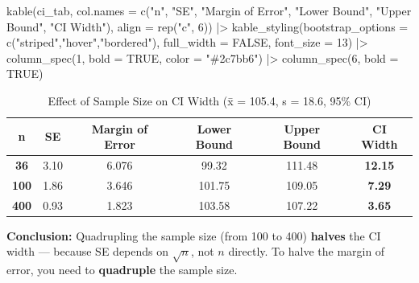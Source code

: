 \documentclass[
  12pt,
  letterpaper,
]{book}
\newenvironment{Shaded}{\begin{snugshade}}{\end{snugshade}}
\newcommand{\AttributeTok}[1]{\textcolor[rgb]{0.40,0.45,0.13}{#1}}
\newcommand{\ConstantTok}[1]{\textcolor[rgb]{0.56,0.35,0.01}{#1}}
\newcommand{\DecValTok}[1]{\textcolor[rgb]{0.68,0.00,0.00}{#1}}
\newcommand{\FunctionTok}[1]{\textcolor[rgb]{0.28,0.35,0.67}{#1}}
\newcommand{\NormalTok}[1]{\textcolor[rgb]{0.00,0.23,0.31}{#1}}
\newcommand{\SpecialCharTok}[1]{\textcolor[rgb]{0.37,0.37,0.37}{#1}}
\newcommand{\StringTok}[1]{\textcolor[rgb]{0.13,0.47,0.30}{#1}}
\begin{document}
\begin{tcolorbox}
\begin{Shaded}
\begin{Highlighting}[]
\FunctionTok{kable}\NormalTok{(ci\_tab,}
      \AttributeTok{col.names =} \FunctionTok{c}\NormalTok{(}\StringTok{"n"}\NormalTok{, }\StringTok{"SE"}\NormalTok{, }\StringTok{"Margin of Error"}\NormalTok{,}
                    \StringTok{"Lower Bound"}\NormalTok{, }\StringTok{"Upper Bound"}\NormalTok{, }\StringTok{"CI Width"}\NormalTok{),}
      \AttributeTok{align =} \FunctionTok{rep}\NormalTok{(}\StringTok{"c"}\NormalTok{, }\DecValTok{6}\NormalTok{)) }\SpecialCharTok{|\textgreater{}}
  \FunctionTok{kable\_styling}\NormalTok{(}\AttributeTok{bootstrap\_options =} \FunctionTok{c}\NormalTok{(}\StringTok{"striped"}\NormalTok{,}\StringTok{"hover"}\NormalTok{,}\StringTok{"bordered"}\NormalTok{),}
                \AttributeTok{full\_width =} \ConstantTok{FALSE}\NormalTok{, }\AttributeTok{font\_size =} \DecValTok{13}\NormalTok{) }\SpecialCharTok{|\textgreater{}}
  \FunctionTok{column\_spec}\NormalTok{(}\DecValTok{1}\NormalTok{, }\AttributeTok{bold =} \ConstantTok{TRUE}\NormalTok{, }\AttributeTok{color =} \StringTok{"\#2c7bb6"}\NormalTok{) }\SpecialCharTok{|\textgreater{}}
  \FunctionTok{column\_spec}\NormalTok{(}\DecValTok{6}\NormalTok{, }\AttributeTok{bold =} \ConstantTok{TRUE}\NormalTok{)}
\end{Highlighting}
\end{Shaded}

\begingroup\fontsize{13}{15}\selectfont

\begin{longtable}[t]{>{}ccccc>{}c}

\caption{\label{tbl-ci-width}Effect of Sample Size on CI Width (x̄ =
105.4, s = 18.6, 95\% CI)}

\tabularnewline

\toprule
n & SE & Margin of Error & Lower Bound & Upper Bound & CI Width\\
\midrule
\textcolor[HTML]{2c7bb6}{\textbf{36}} & 3.10 & 6.076 & 99.32 & 111.48 & \textbf{12.15}\\
\textcolor[HTML]{2c7bb6}{\textbf{100}} & 1.86 & 3.646 & 101.75 & 109.05 & \textbf{7.29}\\
\textcolor[HTML]{2c7bb6}{\textbf{400}} & 0.93 & 1.823 & 103.58 & 107.22 & \textbf{3.65}\\
\bottomrule

\end{longtable}

\endgroup{}

\textbf{Conclusion:} Quadrupling the sample size (from 100 to 400)
\textbf{halves} the CI width --- because SE depends on \(\sqrt{n}\), not
\(n\) directly. To halve the margin of error, you need to
\textbf{quadruple} the sample size.

\end{tcolorbox}
\end{document}
